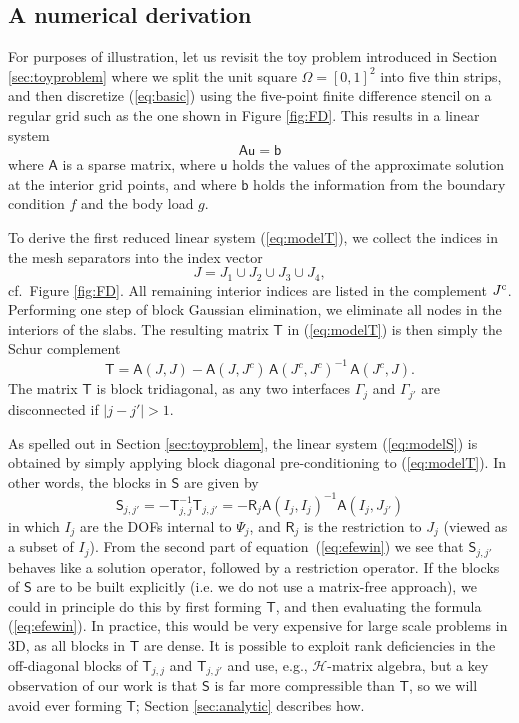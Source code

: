 \documentclass[final,onefignum,onetabnum]{siamart250211}
\newcommand{\vct}[1]{\bm{\mathsf{#1}}}
\newcommand{\mtx}[1]{\bm{\mathsf{#1}}}
\theoremstyle{definition}
\begin{document}
\subsection{A numerical derivation}
\label{sec:LA}

For purposes of illustration, let us revisit the toy problem introduced in
Section \ref{sec:toyproblem} where we split the unit square $\Omega = [0,1]^{2}$
into five thin strips, and then discretize (\ref{eq:basic}) using the five-point finite difference
stencil on a regular grid such as the one shown in Figure \ref{fig:FD}.
This results in a linear system
$$
\mtx{A}\vct{u} = \vct{b}
$$
where $\mtx{A}$ is a sparse matrix, where $\vct{u}$ holds the values of the
approximate solution at the interior grid points, and where $\vct{b}$ holds the information
from the boundary condition $f$ and the body load $g$.

To derive the first reduced linear system (\ref{eq:modelT}), we collect the
indices in the mesh separators into the index vector
$$
J = J_{1} \cup J_{2} \cup J_{3} \cup J_{4},
$$
cf.~Figure \ref{fig:FD}.
All remaining interior indices are listed in the complement $J^{\rm c}$.
Performing one step of block Gaussian elimination, we eliminate all nodes
in the interiors of the slabs. The resulting matrix $\mtx{T}$ in (\ref{eq:modelT})
is then simply the Schur complement
$$
\mtx{T} = \mtx{A}(J,J) - \mtx{A}(J,J^c)\,\mtx{A}(J^c,J^c)^{-1}\,\mtx{A}(J^c,J).
$$
The matrix $\mtx{T}$ is block tridiagonal, as any two interfaces $\Gamma_{j}$
and $\Gamma_{j'}$ are disconnected if $|j-j'| > 1$.


As spelled out in Section \ref{sec:toyproblem}, the linear system (\ref{eq:modelS})
is obtained by simply applying block diagonal pre-conditioning to (\ref{eq:modelT}).
In other words, the blocks in $\mtx{S}$ are given by
\begin{equation}
\label{eq:efewin}
\mtx{S}_{j,j'} = -\mtx{T}_{j,j}^{-1}\mtx{T}_{j,j'} = -\mtx{R}_{j}\mtx{A}(I_j,I_j)^{-1}\mtx{A}(I_j,J_{j'})
\end{equation}
in which $I_j$ are the DOFs internal to $\Psi_j$, and $\mtx{R}_j$ is the restriction to $J_j$ (viewed as a subset of $I_j$). From the second part of equation~(\ref{eq:efewin}) we see that $\mtx{S}_{j,j'}$ behaves like a solution operator, followed by a restriction operator. If the blocks of $\mtx{S}$ are to be built explicitly (i.e. we do not use a matrix-free approach), we could in principle do this by first forming $\mtx{T}$, and then
evaluating the formula (\ref{eq:efewin}). In practice, this would be very expensive for large scale problems in 3D, as all blocks in $\mtx{T}$ are dense. It is possible to exploit rank deficiencies in the off-diagonal blocks of $\mtx{T}_{j,j}$ and $\mtx{T}_{j,j'}$ and use, e.g., $\mathcal{H}$-matrix algebra, but a key observation of our work is that $\mtx{S}$ is far more
compressible than $\mtx{T}$, so we will avoid ever forming $\mtx{T}$; Section \ref{sec:analytic} describes how.
\end{document}
